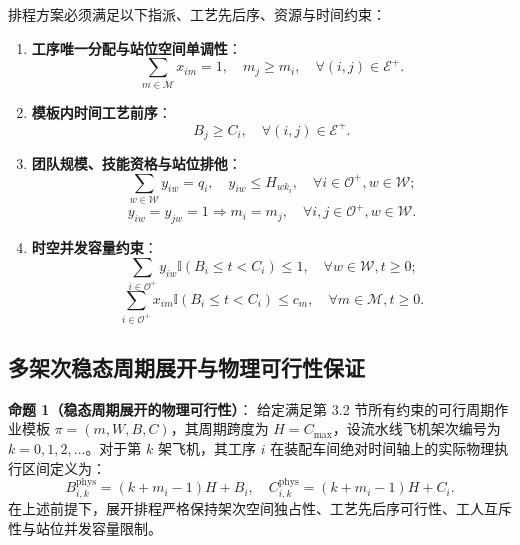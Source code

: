 \documentclass[journal,10pt]{IEEEtran}
\begin{document}
排程方案必须满足以下指派、工艺先后序、资源与时间约束：
\begin{enumerate}
\item \textbf{工序唯一分配与站位空间单调性}：
\begin{equation}
\sum_{m\in\mathcal{M}} x_{im} = 1, \quad m_j \ge m_i, \quad \forall (i,j)\in\mathcal{E}^+.
\end{equation}
\item \textbf{模板内时间工艺前序}：
\begin{equation}
B_j \ge C_i, \quad \forall (i,j)\in\mathcal{E}^+.
\end{equation}
\item \textbf{团队规模、技能资格与站位排他}：
\begin{equation}
\sum_{w\in\mathcal{W}} y_{iw} = q_i, \quad y_{iw} \le H_{w k_i}, \quad \forall i\in\mathcal{O}^+, w\in\mathcal{W};
\end{equation}
\begin{equation}
y_{iw} = y_{jw} = 1 \Longrightarrow m_i = m_j, \quad \forall i,j\in\mathcal{O}^+, w\in\mathcal{W}.
\end{equation}
\item \textbf{时空并发容量约束}：
\begin{equation}
\sum_{i\in\mathcal{O}^+} y_{iw} \mathbb{I}(B_i \le t < C_i) \le 1, \quad \forall w\in\mathcal{W}, t\ge0;
\end{equation}
\begin{equation}
\sum_{i\in\mathcal{O}^+} x_{im} \mathbb{I}(B_i \le t < C_i) \le c_m, \quad \forall m\in\mathcal{M}, t\ge0.
\end{equation}
\end{enumerate}

\subsection{多架次稳态周期展开与物理可行性保证}\label{sec:unfolding}

\textbf{命题 1（稳态周期展开的物理可行性）}：
给定满足第 3.2 节所有约束的可行周期作业模板 $\pi=(m,W,B,C)$，其周期跨度为 $H=C_{\max}$，设流水线飞机架次编号为 $k=0,1,2,\dots$。对于第 $k$ 架飞机，其工序 $i$ 在装配车间绝对时间轴上的实际物理执行区间定义为：
\begin{equation}
B_{i,k}^{\mathrm{phys}} = (k+m_i-1)H + B_i, \quad C_{i,k}^{\mathrm{phys}} = (k+m_i-1)H + C_i.
\end{equation}
在上述前提下，展开排程严格保持架次空间独占性、工艺先后序可行性、工人互斥性与站位并发容量限制。
\end{document}
